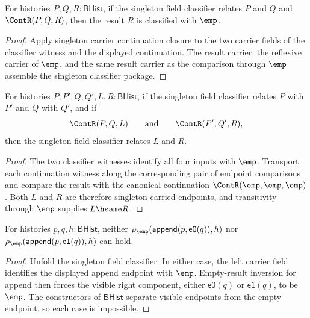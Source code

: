 \begin{theorem}
\label{thm:field-singleton-classifier-continuation-result-classifier}
For histories $P,Q,R:\mathsf{BHist}$, if the singleton field classifier
relates $P$ and $Q$ and $\ContR(P,Q,R)$, then the result $R$ is classified
with $\emp$.
\end{theorem}
\begin{proof}
Apply singleton carrier continuation closure to the two carrier fields of the
classifier witness and the displayed continuation. The result carrier, the
reflexive carrier of $\emp$, and the same result carrier as the comparison
through $\emp$ assemble the singleton classifier package.
\end{proof}

\begin{theorem}
\label{thm:field-singleton-classifier-continuation-closed}
For histories $P,P',Q,Q',L,R:\mathsf{BHist}$, if the singleton field
classifier relates $P$ with $P'$ and $Q$ with $Q'$, and if
$$
\ContR(P,Q,L)
\qquad\text{and}\qquad
\ContR(P',Q',R),
$$
then the singleton field classifier relates $L$ and $R$.
\end{theorem}
\begin{proof}
The two classifier witnesses identify all four inputs with $\emp$. Transport
each continuation witness along the corresponding pair of endpoint
comparisons and compare the result with the canonical continuation
$\ContR(\emp,\emp,\emp)$. Both $L$ and $R$ are therefore singleton-carried
endpoints, and transitivity through $\emp$ supplies $L\hsame R$.
\end{proof}

\begin{theorem}
\label{thm:field-singleton-classifier-append-visible-left-absurd}
For histories $p,q,h:\mathsf{BHist}$, neither
$\rho_{\emp}(\mathsf{append}(p,\mathsf{e0}(q)),h)$ nor
$\rho_{\emp}(\mathsf{append}(p,\mathsf{e1}(q)),h)$ can hold.
\end{theorem}
\begin{proof}
Unfold the singleton field classifier. In either case, the left carrier field
identifies the displayed append endpoint with $\emp$. Empty-result inversion
for append then forces the visible right component, either $\mathsf{e0}(q)$ or
$\mathsf{e1}(q)$, to be $\emp$. The constructors of $\mathsf{BHist}$ separate
visible endpoints from the empty endpoint, so each case is impossible.
\end{proof}

